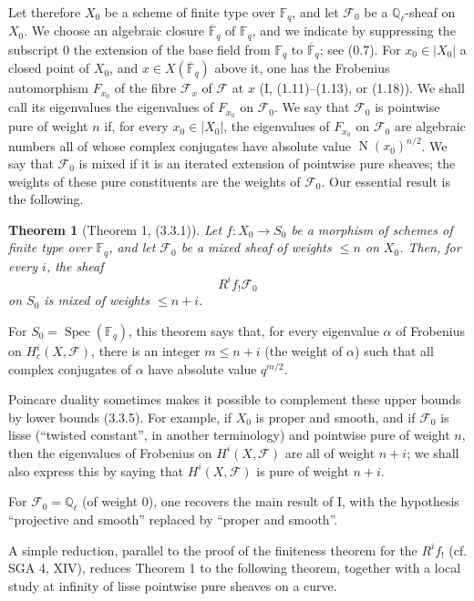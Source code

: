 \documentclass[11pt]{article}
\newtheorem{theorem}{Theorem}
\theoremstyle{remark}
\newcommand{\Ql}{\mathbb{Q}_\ell}
\newcommand{\Fq}{\mathbb{F}_q}
\newcommand{\Fbar}{\overline{\mathbb{F}}_q}
\newcommand{\Spec}{\operatorname{Spec}}
\newcommand{\Norm}{\operatorname{N}}
\begin{document}
Let therefore $X_0$ be a scheme of finite type over $\Fq$, and let $\mathcal F_0$ be a $\Ql$-sheaf on $X_0$. We choose an algebraic closure $\Fbar$ of $\Fq$, and we indicate by suppressing the subscript $0$ the extension of the base field from $\Fq$ to $\Fbar$; see (0.7). For $x_0\in |X_0|$ a closed point of $X_0$, and $x\in X(\Fbar)$ above it, one has the Frobenius automorphism $F_{x_0}$ of the fibre $\mathcal F_x$ of $\mathcal F$ at $x$ (I, (1.11)--(1.13), or (1.18)). We shall call its eigenvalues the eigenvalues of $F_{x_0}$ on $\mathcal F_0$. We say that $\mathcal F_0$ is pointwise pure of weight $n$ if, for every $x_0\in |X_0|$, the eigenvalues of $F_{x_0}$ on $\mathcal F_0$ are algebraic numbers all of whose complex conjugates have absolute value $\Norm(x_0)^{n/2}$. We say that $\mathcal F_0$ is mixed if it is an iterated extension of pointwise pure sheaves; the weights of these pure constituents are the weights of $\mathcal F_0$. Our essential result is the following.

\begin{theorem}[Theorem 1, (3.3.1)]
Let $f:X_0\to S_0$ be a morphism of schemes of finite type over $\Fq$, and let $\mathcal F_0$ be a mixed sheaf of weights $\le n$ on $X_0$. Then, for every $i$, the sheaf
\[
R^i f_!\mathcal F_0
\]
on $S_0$ is mixed of weights $\le n+i$.
\end{theorem}

For $S_0=\Spec(\Fq)$, this theorem says that, for every eigenvalue $\alpha$ of Frobenius on $H^i_c(X,\mathcal F)$, there is an integer $m\le n+i$ (the weight of $\alpha$) such that all complex conjugates of $\alpha$ have absolute value $q^{m/2}$.

Poincare duality sometimes makes it possible to complement these upper bounds by lower bounds (3.3.5). For example, if $X_0$ is proper and smooth, and if $\mathcal F_0$ is lisse (``twisted constant'', in another terminology) and pointwise pure of weight $n$, then the eigenvalues of Frobenius on $H^i(X,\mathcal F)$ are all of weight $n+i$; we shall also express this by saying that $H^i(X,\mathcal F)$ is pure of weight $n+i$.

For $\mathcal F_0=\Ql$ (of weight $0$), one recovers the main result of I, with the hypothesis ``projective and smooth'' replaced by ``proper and smooth''.

A simple reduction, parallel to the proof of the finiteness theorem for the $R^i f_!$ (cf. SGA 4, XIV), reduces Theorem 1 to the following theorem, together with a local study at infinity of lisse pointwise pure sheaves on a curve.
\end{document}
